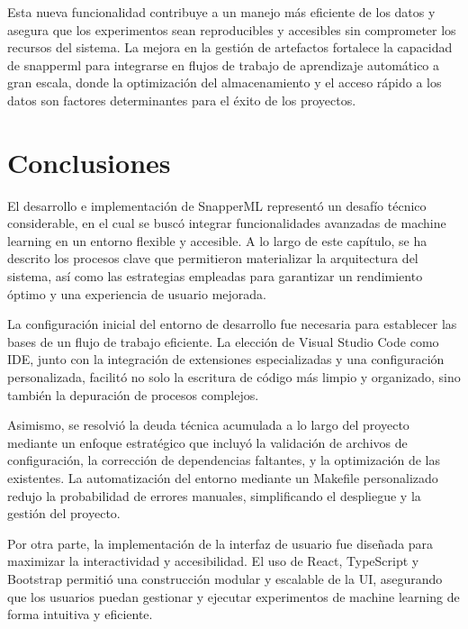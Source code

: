 Esta nueva funcionalidad contribuye a un manejo más eficiente de los datos y asegura que los experimentos sean reproducibles y accesibles sin comprometer los recursos del sistema. La mejora en la gestión de artefactos fortalece la capacidad de \Gls{snapperml} para integrarse en flujos de trabajo de aprendizaje automático a gran escala, donde la optimización del almacenamiento y el acceso rápido a los datos son factores determinantes para el éxito de los proyectos.

\section{Conclusiones}
El desarrollo e implementación de SnapperML representó un desafío técnico considerable, en el cual se buscó integrar funcionalidades avanzadas de machine learning en un entorno flexible y accesible. A lo largo de este capítulo, se ha descrito los procesos clave que permitieron materializar la arquitectura del sistema, así como las estrategias empleadas para garantizar un rendimiento óptimo y una experiencia de usuario mejorada.

\vspace{2.5mm}

La configuración inicial del entorno de desarrollo fue necesaria para establecer las bases de un flujo de trabajo eficiente. La elección de Visual Studio Code como IDE, junto con la integración de extensiones especializadas y una configuración personalizada, facilitó no solo la escritura de código más limpio y organizado, sino también la depuración de procesos complejos.

\vspace{2.5mm}

Asimismo, se resolvió la deuda técnica acumulada a lo largo del proyecto mediante un enfoque estratégico que incluyó la validación de archivos de configuración, la corrección de dependencias faltantes, y la optimización de las existentes. La automatización del entorno mediante un Makefile personalizado redujo la probabilidad de errores manuales, simplificando el despliegue y la gestión del proyecto.

\vspace{2.5mm}

Por otra parte, la implementación de la interfaz de usuario fue diseñada para maximizar la interactividad y accesibilidad. El uso de React, TypeScript y Bootstrap permitió una construcción modular y escalable de la UI, asegurando que los usuarios puedan gestionar y ejecutar experimentos de machine learning de forma intuitiva y eficiente.

